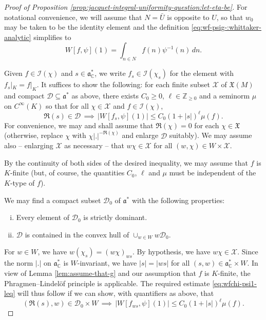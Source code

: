\documentclass[reqno]{amsart}
\theoremstyle{plain} \newtheorem{theorem} {Theorem}
\theoremstyle{definition} \newtheorem{definition} [theorem] {Definition}
\theoremstyle{itplain} %
\numberwithin{equation}{section}
\numberwithin{theorem}{section}
\renewcommand{\geq}{\geqslant}
\renewcommand{\leq}{\leqslant}
\begin{document}
\begin{proof}[Proof of Proposition \ref{prop:jacquet-integral-uniformity-question:let-eta-be}]
  For notational convenience, we will assume that $N = \bar{U}$ is opposite to $U$, so that $w_0$ may be taken to be the identity element and the definition \ref{eq:wf-psig-:whittaker-analytic} simplifies to
  \begin{equation}\label{eq:wf-psi1-=whittaker-integral-simplified}
    W[f, \psi](1) = \int _{n \in N } f (n) \psi^{-1}(n) \, d n.
  \end{equation}

  Given $f \in \mathcal{I}(\chi)$ and $s \in \mathfrak{a}_{\mathbb{C}}^*$, we write $f_s \in \mathcal{I}(\chi_s)$ for the element with $f_s|_{K} = f|_K$.  It suffices to show the following: for each finite subset $\mathcal{X}$ of  $\mathfrak{X}(M)$ and compact $\mathcal{D} \subseteq \mathfrak{a}^*$ as above, there exists $C_0 \geq 0$, $\ell \in \mathbb{Z}_{\geq 0}$ and a seminorm $\mu$ on $C^\infty(K)$ so that for all $\chi \in \mathcal{X}$ and $f \in \mathcal{I}(\chi)$,
  \begin{equation}\label{eq:wfchi-psi1-leq}
    \Re(s) \in \mathcal{D} \, \implies \, |W[f_s, \psi](1)| \leq C_0 (1 + |s|)^{\ell} \mu(f).
  \end{equation}
  For convenience, we may and shall assume that $\Re(\chi) = 0$ for each $\chi \in \mathfrak{X}$ (otherwise, replace $\chi$ with $\chi |.|^{-\Re(\chi)}$ and enlarge $\mathcal{D}$ suitably).  We may assume also -- enlarging $\mathcal{X}$ as necessary -- that $w \chi \in \mathcal{X}$ for all $(w,\chi) \in W \times \mathcal{X}$.

  By the continuity of both sides of the desired inequality, we may assume that $f$ is $K$-finite (but, of course, the quantities $C_0$, $\ell$ and $\mu$ must be independent of the $K$-type of $f$).

  We may find a compact subset $\mathcal{D}_0$ of $\mathfrak{a}^*$ with the following properties:
  \begin{enumerate}[(i)]
  \item Every element of $\mathcal{D}_0$ is strictly dominant.
  \item $\mathcal{D}$ is contained in the convex hull of $\cup_{w \in W} w \mathcal{D}_0$.
  \end{enumerate}
  For $w \in W$, we have $w(\chi_s) = (w \chi)_{w s}$.  By hypothesis, we have $w \chi \in \mathcal{X}$.  Since the norm $|.|$ on $\mathfrak{a}_{\mathbb{C}}^*$ is $W$-invariant, we have $|s| = |w s|$ for all $(s,w) \in \mathfrak{a}_{\mathbb{C}}^* \times W$.  In view of Lemma \ref{lem:assume-that-g} and our assumption that $f$ is $K$-finite, the Phragmen--Lindel\"{o}f principle is applicable.  The required estimate \eqref{eq:wfchi-psi1-leq} will thus follow if we can show, with quantifiers as above, that
  \begin{equation}\label{eq:wfchi-psi1-leq-2}
    (\Re(s),w) \in \mathcal{D}_0 \times W \, \implies \,
    |W[f_{w s}, \psi](1)| \leq C_0 (1 + |s|)^{\ell} \mu(f).
  \end{equation}


\end{proof}
\end{document}
